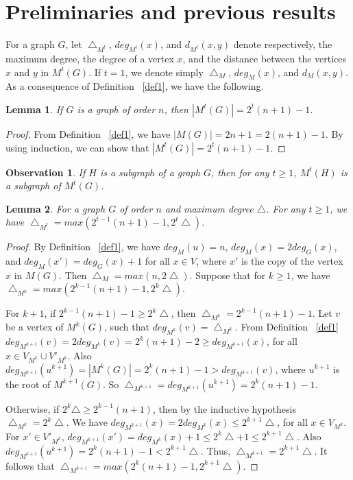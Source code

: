 \documentclass{article}
\newtheorem{lemma} {Lemma}
\newtheorem{obs}{Observation}
\newtheorem{open problem} {Open Problem}
\numberwithin{lemma}{section}
\numberwithin{theorem}{section}
\numberwithin{cor}{section}
\numberwithin{prop}{section}
\numberwithin{con}{section}
\numberwithin{claim}{section}
\numberwithin{obs}{section}
\numberwithin{dnt}{section}
\begin{document}
\section{Preliminaries and previous results}
\label{sec2}
\par For a graph $G$, let $\bigtriangleup_{M^t}$, $deg_{M^t}(x)$, and $d_{M^t}(x,y)$ denote  respectively, the maximum degree, the degree of a vertex $x$, and the distance between the vertices $x$ and $y$ in $M^t(G)$. If $t=1$, we denote simply $\bigtriangleup_M$, $deg_M(x)$, and $d_M(x,y)$. As a consequence of Definition ~\ref{def1}, we have the following.
\begin{lemma}\label{lem2.1}
	If $G$ is a graph of order $n$, then  $|M^t(G)|=2^t(n+1)-1$.
\end{lemma}
\begin{proof} 
	From Definition ~\ref{def1}, we have $|M(G)|=2n+1=2(n+1)-1$. By using induction, we can show that $|M^t(G)|=2^t(n+1)-1$.
\end{proof}
\begin{obs}\label{lem2.2}
	If $H$ is a subgraph of a graph $G$, then for any $t\geq 1$, $M^t(H)$ is a subgraph of $M^t(G)$. 
\end{obs}
\begin{lemma}\label{lem2.3}
	For a graph $G$ of order $n$ and maximum degree $\bigtriangleup$. For any $t\geq1$, we have $\bigtriangleup_{M^t}=max(2^{t-1}(n+1)-1, 2^t\bigtriangleup)$.
\end{lemma}
\begin{proof} 
	By  Definition ~\ref{def1}, we have $deg_{M}(u)=n$, $deg_{M}(x)=2deg_G(x)$, and $deg_{M}(x')=deg_G(x)+1$ for all $x \in V$, where $x'$ is the copy of the vertex $x$ in $M(G)$. Then $\bigtriangleup_{M}=max(n, 2\bigtriangleup)$. 	Suppose that for $k\geq 1$, we have $\bigtriangleup_{M^k}=max(2^{k-1}(n+1)-1, 2^k\bigtriangleup)$. \par
	For $k+1$, if $2^{k-1}(n+1)-1 \geq 2^k\bigtriangleup$, then $\bigtriangleup_{M^k}=2^{k-1}(n+1)-1$. Let $v$ be a vertex of  $M^k(G)$, such that $deg_{M^k}(v)=\bigtriangleup_{M^k}$. From Definition ~\ref{def1} $deg_{M^{k+1}}(v)=2deg_{M^k}(v)=2^k(n+1)-2 \geq deg_{M^{k+1}}(x)$, for all $x \in V_{M^k} \cup V'_{M^k} $. Also  $deg_{M^{k+1}}(u^{k+1})=|M^k(G)|=2^k(n+1)-1 > deg_{M^{k+1}}(v)$, where $u^{k+1}$ is the root of $M^{k+1}(G)$. So $\bigtriangleup_{M^{k+1}}=deg_{M^{k+1}}(u^{k+1})=2^k(n+1)-1$.
	\par  Otherwise, if $2^k\bigtriangleup \geq 2^{k-1}(n+1)$, then by the inductive hypothesis $\bigtriangleup_{M^k}=2^k\bigtriangleup$.  We have $deg_{M^{k+1}}(x)=2deg_{M^k}(x)\leq 2^{k+1} \bigtriangleup$, for all $x \in V_{M^k}$. For $x' \in V'_{M^k}$, $deg_{M^{k+1}}(x')=deg_{M^k}(x)+1 \leq 2^k\bigtriangleup+1\leq 2^{k+1} \bigtriangleup $. Also $ deg_{M^{k+1}}(u^{k+1})=2^k(n+1)-1<2^{k+1} \bigtriangleup$. Thus, $\bigtriangleup_{M^{k+1}}=2^{k+1} \bigtriangleup$. It follows that $\bigtriangleup_{M^{k+1}}=max(2^k(n+1)-1,2^{k+1}\bigtriangleup)$.	
\end{proof}
\end{document}
